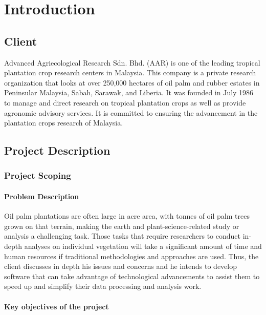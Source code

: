\documentclass[a4paper, 12pt]{article}
\begin{document}
\newpage

\section{Introduction}

\subsection{Client}

Advanced Agriecological Research Sdn. Bhd. (AAR) is one of the leading tropical plantation crop research centers in Malaysia. This company is a private research organization that looks at over 250,000 hectares of oil palm and rubber estates in Peninsular Malaysia, Sabah, Sarawak, and Liberia. It was founded in July 1986 to manage and direct research on tropical plantation crops as well as provide agronomic advisory services. It is committed to ensuring the advancement in the plantation crops research of Malaysia.

\subsection{Project Description}

\subsubsection{Project Scoping}

\paragraph{Problem Description}

Oil palm plantations are often large in acre area, with tonnes of oil palm trees grown on that terrain, making the earth and plant-science-related study or analysis a challenging task. Those tasks that require researchers to conduct in-depth analyses on individual vegetation will take a significant amount of time and human resources if traditional methodologies and approaches are used. Thus, the client discusses in depth his issues and concerns and he intends to develop software that can take advantage of technological advancements to assist them to speed up and simplify their data processing and analysis work.

\paragraph{Key objectives of the project}
\end{document}
